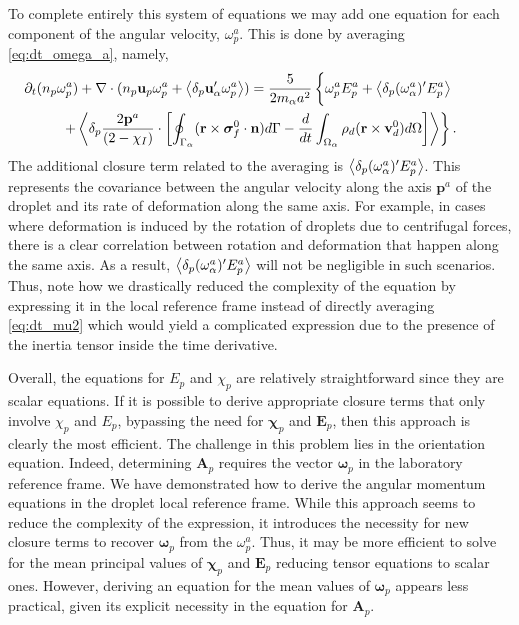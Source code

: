 To complete entirely this system of equations we may add one equation for each component of the angular velocity, $\omega_p^a$. 
This is done by averaging \ref{eq:dt_omega_a}, namely,
\begin{multline}
    \pddt (n_p \omega^a_p)
    + \div (
        n_p \textbf{u}_p \omega^a_p 
        + \pavg{\textbf{u}_\alpha' \omega^a_p}
    )
    = 
    \frac{5}{2 m_\alpha a^2}\left\{
        \omega^a_p E^a_p + \pavg{(\omega^a_\alpha)' E^a_p} \phantom{\intS{}} \right. \\ \left.
        +\pavg{
        \frac{2 \textbf{p}^a}{ (2 - \chi_I)}\cdot 
        \left[\intS{(\textbf{r}\times\bm\sigma_f^0\cdot \textbf{n})} 
        - \ddt\intO{\rho_d(\textbf{r}\times \textbf{v}_d^0)}\right]
        }
    \right\}. 
\end{multline}
The additional closure term related to the averaging is $\left<\delta_p (\omega^a_\alpha)' E^a_p\right>$.
This represents the covariance between the angular velocity along the axis $\textbf{p}^a$ of the droplet and its rate of deformation along the same axis. 
For example, in cases where deformation is induced by the rotation of droplets due to centrifugal forces, there is a clear correlation between rotation and deformation that happen along the same axis. 
As a result, $\left<\delta_p (\omega^a_\alpha)' E^a_p\right>$ will not be negligible in such scenarios.
Thus, note how we drastically reduced the complexity of the equation by expressing it in the local reference frame instead of directly averaging \ref{eq:dt_mu2} which would yield a complicated expression due to the presence of the inertia tensor inside the time derivative.  

Overall, the equations for $E_p$ and $\chi_p$ are relatively straightforward since they are scalar equations. 
If it is possible to derive appropriate closure terms that only involve $\chi_p$ and $E_p$, bypassing the need for $\bm\chi_p$ and $\textbf{E}_p$, then this approach is clearly the most efficient. 
The challenge in this problem lies in the orientation equation.
Indeed, determining $\textbf{A}_p$ requires the vector $\bm\omega_p$ in the laboratory reference frame.
We have demonstrated how to derive the angular momentum equations in the droplet local reference frame. 
While this approach seems to reduce the complexity of the expression, it introduces the necessity for new closure terms to recover $\bm\omega_p$ from the $\omega^a_p$. 
Thus, it may be more efficient to solve for the mean principal values of $\bm\chi_p$ and $\textbf{E}_p$ reducing tensor equations to scalar ones.
However, deriving an equation for the mean values of $\bm\omega_p$ appears less practical, given its explicit necessity in the equation for $\textbf{A}_p$. 

